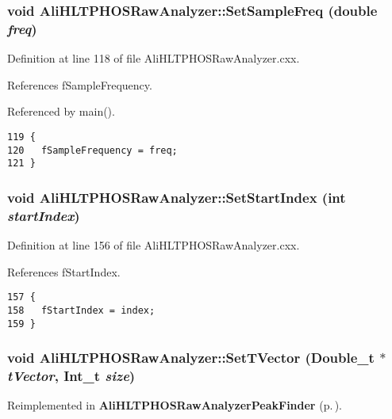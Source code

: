 \subsubsection{\setlength{\rightskip}{0pt plus 5cm}void Ali\-HLTPHOSRaw\-Analyzer::Set\-Sample\-Freq (double {\em freq})}\label{classAliHLTPHOSRawAnalyzer_AliHLTPHOSRawAnalyzerPeakFindera13}




Definition at line 118 of file Ali\-HLTPHOSRaw\-Analyzer.cxx.

References f\-Sample\-Frequency.

Referenced by main().

\footnotesize\begin{verbatim}119 {
120   fSampleFrequency = freq;
121 }
\end{verbatim}\normalsize 


\subsubsection{\setlength{\rightskip}{0pt plus 5cm}void Ali\-HLTPHOSRaw\-Analyzer::Set\-Start\-Index (int {\em start\-Index})}\label{classAliHLTPHOSRawAnalyzer_AliHLTPHOSRawAnalyzerPeakFindera14}




Definition at line 156 of file Ali\-HLTPHOSRaw\-Analyzer.cxx.

References f\-Start\-Index.

\footnotesize\begin{verbatim}157 {
158   fStartIndex = index;
159 }
\end{verbatim}\normalsize 


\subsubsection{\setlength{\rightskip}{0pt plus 5cm}void Ali\-HLTPHOSRaw\-Analyzer::Set\-TVector (Double\_\-t $\ast$ {\em t\-Vector}, Int\_\-t {\em size})\hspace{0.3cm}{\tt  [virtual]}}\label{classAliHLTPHOSRawAnalyzer_AliHLTPHOSRawAnalyzerLMSa16}




Reimplemented in {\bf Ali\-HLTPHOSRaw\-Analyzer\-Peak\-Finder} {\rm (p.\,\pageref{classAliHLTPHOSRawAnalyzerPeakFinder_AliHLTPHOSRawAnalyzerPeakFindera4})}.

